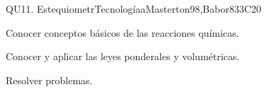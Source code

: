 \begin{syllabus}
\begin{unit}{QU11. EstequiometrTecnologíaa}{}{Masterton98,Babor83}{3}{C20}
   \begin{learningoutcomes}
      \item Conocer conceptos básicos de las reacciones químicas.
      \item Conocer y aplicar las leyes ponderales y volumétricas.
      \item Resolver problemas.
   \end{learningoutcomes}
\end{unit}

\begin{coursebibliography}
\end{coursebibliography}

\end{syllabus}
